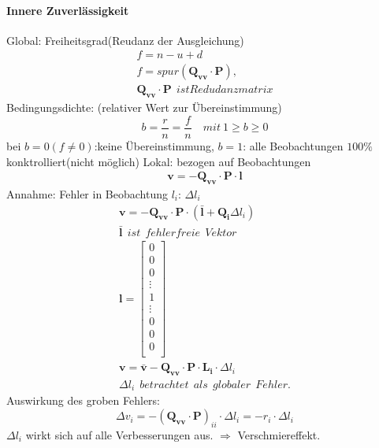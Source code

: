 \documentclass[12pt]{article}
\begin{document}
\paragraph{Innere Zuverlässigkeit}
\noindent Global:\newline 
Freiheitsgrad(Reudanz der Ausgleichung) 
\begin{gather*}
f = n - u + d \\
f = spur(\bm{Q_{vv}} \cdot \bm{P}),\\
\bm{Q_{vv}} \cdot \bm{P} \ \ ist Redudanzmatrix
\end{gather*}
Bedingungsdichte: (relativer Wert zur Übereinstimmung)
\begin{equation*}
b = \frac{r}{n} = \frac{f}{n} \quad mit \  1 \geq b \geq 0
\end{equation*}
bei $b = 0(f \neq 0)$:keine Übereinstimmung, $b = 1$: alle Beobachtungen $100 \%$ konktrolliert(nicht möglich)
Lokal: \newline
bezogen auf Beobachtungen
\begin{gather*}
\bm{v} = -\bm{Q_{vv}} \cdot \bm{P} \cdot \bm{l}
\end{gather*}
Annahme: Fehler in Beobachtung $l_i$: $\Delta l_i$
\begin{gather*}
\bm{v} = -\bm{Q_{vv}} \cdot \bm{P} \cdot (\bar{\bm{l}} + \bm{Q_i} \Delta l_i)\\
\bar{\bm{l}}\ \ ist\ \ fehlerfreie\  \ Vektor \\
\bm{l} = \begin{bmatrix}
0\\
0\\
0\\
\vdots \\
1\\
\vdots\\
0\\
0\\
0\\
\end{bmatrix} \\
\bm{v} = \bar{\bm{v}} - \bm{Q_{vv}} \cdot \bm{P} \cdot \bm{L_i} \cdot \Delta l_i\\
\Delta l_i \ \ betrachtet\ \  als\ \  globaler\ \  Fehler.
\end{gather*}
Auswirkung des groben Fehlers:
\begin{equation*}
\Delta v_i = -(\bm{Q_{vv}} \cdot \bm{P})_{ii} \cdot \Delta l_i = -r_i \cdot \Delta l_i
\end{equation*}
$\Delta l_i$ wirkt sich auf alle Verbesserungen aus. $\Rightarrow$ Verschmiereffekt.\newline
\end{document}
